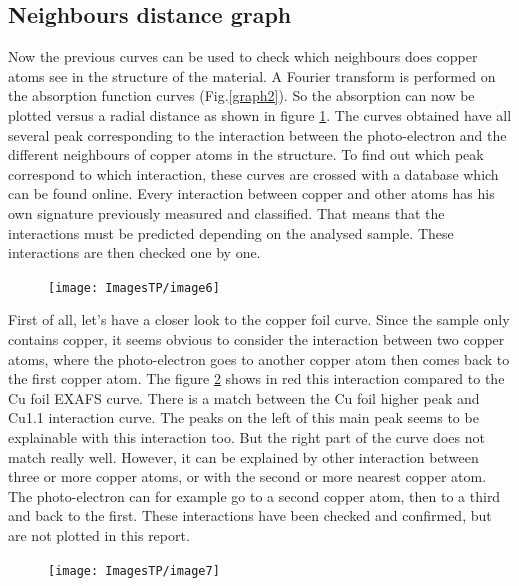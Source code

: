 \documentclass[11pt,a4paper,oneside]{report}
\begin{document}
\subsection{Neighbours distance graph}
Now the previous curves can be used to check which neighbours does copper atoms see in the structure of the material. A Fourier transform is performed on the absorption function curves (Fig.\ref{graph2}). So the absorption can now be plotted versus a radial distance as shown in figure \ref{graph3}. The curves obtained have all several peak corresponding to the interaction between the photo-electron and the different neighbours of copper atoms in the structure. To find out which peak correspond to which interaction, these curves are crossed with a database which can be found online. Every interaction between copper and other atoms has his own signature previously measured and classified. That means that the interactions must be predicted depending on the analysed sample. These interactions are then checked one by one.



\begin{figure}[H]
    \begin{center}
        \texttt{[image: ImagesTP/image6]}
        \caption{}
        \label{graph3}
    \end{center}
\end{figure}


First of all, let’s have a closer look to the copper foil curve. Since the sample only contains copper, it seems obvious to consider the interaction between two copper atoms, where the photo-electron goes to another copper atom then comes back to the first copper atom. The figure \ref{graph4} shows in red this interaction compared to the Cu foil EXAFS curve. There is a match between the Cu foil higher peak and Cu1.1 interaction curve. The peaks on the left of this main peak seems to be explainable with this interaction too. But the right part of the curve does not match really well. However, it can be explained by other interaction between three or more copper atoms, or with the second or more nearest copper atom. The photo-electron can for example go to a second copper atom, then to a third and back to the first. These interactions have been checked and confirmed, but are not plotted in this report.

\begin{figure}[H]
    \begin{center}
        \texttt{[image: ImagesTP/image7]}
        \caption{}
        \label{graph4}
    \end{center}
\end{figure}
\end{document}
